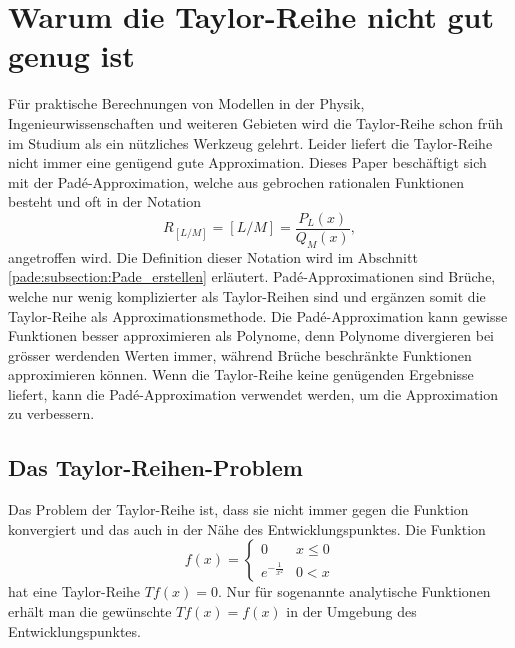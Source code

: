%
%
%
\section{Warum die Taylor-Reihe nicht gut genug ist\label{pade:section:einleitung}}
%
Für praktische Berechnungen von Modellen in der Physik, Ingenieurwissenschaften und weiteren Gebieten wird die Taylor-Reihe schon früh im Studium als ein nützliches Werkzeug gelehrt.
%
%
%
%
Leider liefert die Taylor-Reihe nicht immer eine genügend gute Approximation.
Dieses Paper beschäftigt sich mit der Padé-Approximation, welche aus gebrochen rationalen Funktionen besteht und oft in der Notation
\begin{equation*}
R_{[L/M]}
=
[L/M]
=
\frac{P_{L}(x)}{Q_{M}(x)},
\end{equation*}
angetroffen wird. 
Die Definition dieser Notation wird im Abschnitt \ref{pade:subsection:Pade_erstellen} erläutert.
Padé-Appro\-xi\-ma\-tio\-nen sind Brüche, welche nur wenig komplizierter
als Taylor-Reihen sind und ergänzen somit die Taylor-Reihe als
Approximationsmethode.
Die Padé-Approximation kann gewisse Funktionen besser approximieren als Polynome, denn Polynome divergieren bei grösser werdenden Werten immer, während Brüche beschränkte Funktionen approximieren können.
Wenn die Taylor-Reihe keine genügenden Ergebnisse liefert, kann die Padé-Approximation verwendet werden, um die Approximation zu verbessern.

 

\subsection{Das Taylor-Reihen-Problem
\label{pade:Taylorfehler}}

Das Problem der Taylor-Reihe ist, dass sie nicht immer gegen die Funktion konvergiert und das auch in der Nähe des Entwicklungspunktes.
Die Funktion 
\begin{equation}
f(x)
=
\left\{\begin{array}{cc}
0 & x\le 0  \\
e^{-\frac{1}{x^2}} & 0 < x
\end{array}\right.\end{equation}
hat eine Taylor-Reihe $Tf(x)=0$.
Nur für sogenannte analytische Funktionen erhält man die gewünschte $Tf(x)=f(x)$ in der Umgebung des Entwicklungspunktes. 

